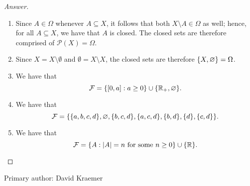 \begin{proof}[Answer]
    \begin{enumerate}
        \item Since $A \in \Omega$ whenever $A \subseteq X$, it follows that
            both $X \setminus A \in \Omega$ as well; hence, for all $A \subseteq
            X$, we have that $A$ is closed. The closed sets are therefore
            comprised of $\mathcal{P}(X) = \Omega$.
        \item Since $X = X \setminus \emptyset$ and $\emptyset = X \setminus X$,
            the closed sets are therefore $\{X, \varnothing\} = \Omega$.
        \item We have that
            \[
                \mathcal{F} = \{[0, a] : a \geq 0\} \cup \{\mathbb{R}_+,\varnothing\}.
            \]
        \item We have that
            \[
                \mathcal{F} = \{
                    \{a,b,c,d\}, \varnothing, \{b,c,d\}, \{a,c,d\},
                    \{b,d\}, \{d\}, \{c, d\}
                \}.
            \]
        \item We have that 
            \[
                \mathcal{F} = \{A : |A| = n \text{ for some } n \geq 0\}
                \cup \{\mathbb{R}\}. \qedhere
            \]
    \end{enumerate}
\end{proof}

Primary author: David Kraemer


